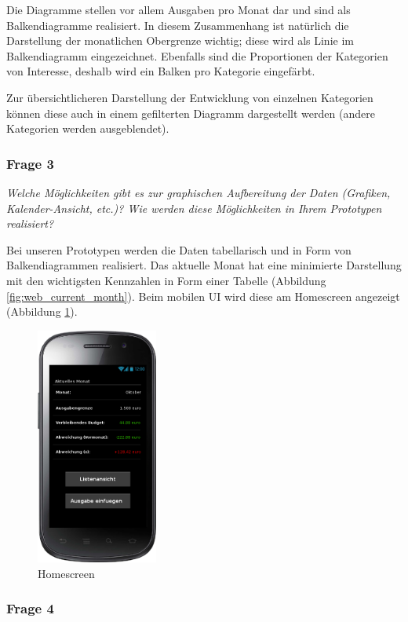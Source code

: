 Die Diagramme stellen vor allem Ausgaben pro Monat dar und sind als Balkendiagramme realisiert.
In diesem Zusammenhang ist nat\"urlich die Darstellung der monatlichen Obergrenze wichtig;
diese wird als Linie im Balkendiagramm eingezeichnet. Ebenfalls sind die Proportionen der Kategorien
von Interesse, deshalb wird ein Balken pro Kategorie eingef\"arbt.

Zur \"ubersichtlicheren Darstellung der Entwicklung von einzelnen Kategorien k\"onnen
diese auch in einem gefilterten Diagramm dargestellt werden (andere Kategorien werden
ausgeblendet).



\subsubsection{Frage 3}

\emph{Welche Möglichkeiten gibt es zur graphischen Aufbereitung der Daten 
(Grafiken, Kalender-Ansicht, etc.)? Wie werden diese Möglichkeiten in Ihrem Prototypen realisiert?}

\vspace{2mm}
Bei unseren Prototypen werden die Daten tabellarisch und in Form von Balkendiagrammen realisiert.
Das aktuelle Monat hat eine minimierte Darstellung mit den wichtigsten Kennzahlen in Form einer 
Tabelle (Abbildung \ref{fig:web_current_month}). Beim mobilen UI wird diese am Homescreen angezeigt
(Abbildung \ref{fig:smartphone_homescreen}).

\begin{figure}[htl]
\centering
\includegraphics[width=4cm]{img/smartphone_homescreen}
\caption{Homescreen}
\label{fig:smartphone_homescreen}
\end{figure}

\newpage
\subsubsection{Frage 4}

